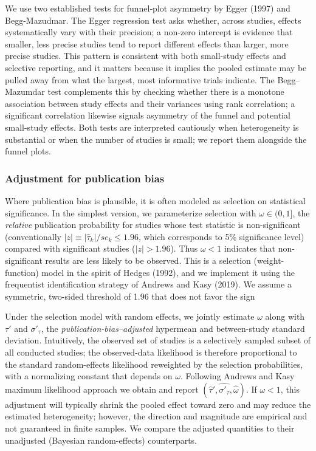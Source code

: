 \documentclass[12pt]{article}
\begin{document}
We use two established tests for funnel‐plot asymmetry by Egger (1997) and Begg-Mazudmar. The Egger regression test asks whether, across studies, effects systematically vary with their precision; a non-zero intercept is evidence that smaller, less precise studies tend to report different effects than larger, more precise studies. This pattern is consistent with both small-study effects and selective reporting, and it matters because it implies the pooled estimate may be pulled away from what the largest, most informative trials indicate. The Begg–Mazumdar test complements this by checking whether there is a monotone association between study effects and their variances using rank correlation; a significant correlation likewise signals asymmetry of the funnel and potential small-study effects. Both tests are interpreted cautiously when heterogeneity is substantial or when the number of studies is small; we report them alongside the funnel plots.

\subsubsection{Adjustment for publication bias}

Where publication bias is plausible, it is often modeled as selection on statistical significance. In the simplest version, we parameterize selection with \(\omega \in (0,1]\), the \emph{relative} publication probability for studies whose test statistic is non-significant (conventionally \(|z| \equiv |\hat{\tau}_k| / se_k \le 1.96\), which corresponds to 5\% significance level) compared with significant studies (\(|z|>1.96\)). Thus \(\omega<1\) indicates that non-significant results are less likely to be observed. This is a selection (weight-function) model in the spirit of Hedges (1992), and we implement it using the frequentist identification strategy of Andrews and Kasy (2019). We assume a symmetric, two-sided threshold of 1.96 that does not favor the sign

Under the selection model with random effects, we jointly estimate \(\omega\) along with \(\tau'\) and \(\sigma'_{\tau}\), the \emph{publication-bias–adjusted} hypermean and between-study standard deviation. Intuitively, the observed set of studies is a selectively sampled subset of all conducted studies; the observed-data likelihood is therefore proportional to the standard random-effects likelihood reweighted by the selection probabilities, with a normalizing constant that depends on \(\omega\). Following Andrews and Kasy maximum likelihood approach we obtain and report \((\hat\tau', \widehat{\sigma'_{\tau}}, \hat\omega)\). If $\omega < 1$, this adjustment will typically shrink the pooled effect toward zero and may reduce the estimated heterogeneity; however, the direction and magnitude are empirical and not guaranteed in finite samples. We compare the adjusted quantities to their unadjusted (Bayesian random-effects) counterparts.
\end{document}
